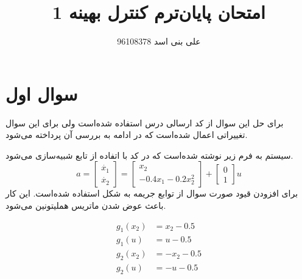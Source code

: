 \documentclass[12 pt]{article}
\title{امتحان پایان‌ترم کنترل بهینه 1}
\author{علی بنی اسد 96108378}
\begin{document}
	\maketitle
	\section*{سوال اول}
برای حل این سوال از کد ارسالی درس استفاده شده‌است ولی برای این سوال تغییراتی اعمال شده‌است که در ادامه به بررسی آن پرداخته می‌شود.


سیستم به فرم زیر نوشته شده‌‌است که در کد با اتفاده از تابع   شبیه‌سازی می‌شود.
$$
a = \begin{bmatrix}
	\dot{x_1}\\
	\dot{x_2}
\end{bmatrix} = \begin{bmatrix}
x_2\\
-0.4x_1 -0.2x_2^2
\end{bmatrix} + \begin{bmatrix}
0\\
1
\end{bmatrix}u
$$
برای افزودن قیود صورت سوال از توابع جریمه به شکل 
استفاده شده‌است. این کار باعث عوض شدن ماتریس هملیتونین می‌شود.

\begin{align*}
	g_1(x_2) &= x_2 - 0.5\\
	g_1(u) &= u - 0.5\\
	g_2(x_2) &= -x_2 - 0.5\\
	g_2(u) &= -u - 0.5\\
\end{align*}
\end{document}
